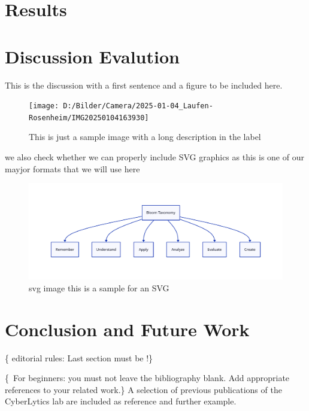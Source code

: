\documentclass[conference,flushend]{iaria}
\begin{document}
\section{Results}
\lipsum[24]

\section{Discussion \textbar{} Evalution}
This is the discussion with a first sentence and a figure to be included here.

\begin{figure}[ht]
	\centering
	\texttt{[image: D:/Bilder/Camera/2025-01-04\_Laufen-Rosenheim/IMG20250104163930]}
	\caption[Sample image]{This is just a sample image with a long description in the label}
	\label{fig:img_sample1}
\end{figure}

we also check whether we can properly include SVG graphics as this is one of our mayjor formats that we will use here


\begin{figure}[htbp]
	\centering
	\includegraphics[width=1.0\linewidth]{img/bloom.pdf}
	\caption{svg image this is a sample for an SVG}
\end{figure}

\lipsum[25]

\section{Conclusion and Future Work}
\{\faWarning{}  editorial rules: Last section must be !\}
\lipsum[26]

\{\,\faWarning{} For beginners: you must not leave the bibliography blank. Add appropriate references to your related work.\}
%
A selection of previous   publications of the CyberLytics lab
%
%
\cite{%
LeNe24goalHijackingLLMs,%
LeNe24vocattllm,%
PANP23seccloudfogai,%
StNe23foodfresh}
%
%
are included as reference and further example.

\begingroup
\sloppy
\printbibliography
\endgroup 
\end{document}
